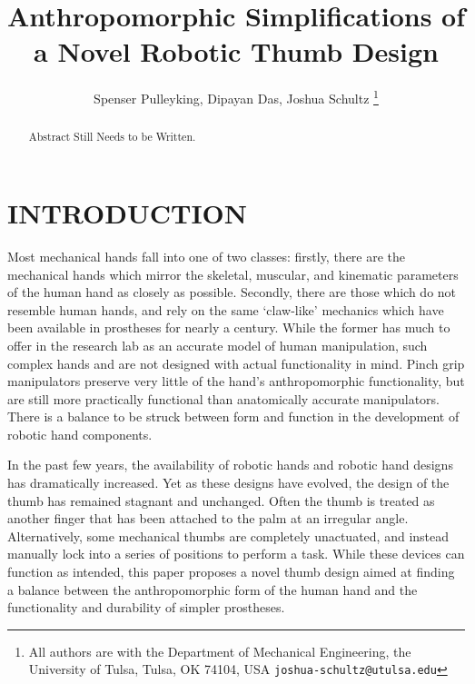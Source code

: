 \documentclass[letterpaper, 10 pt, conference]{ieeeconf}  %
\title{\LARGE \bf
Anthropomorphic Simplifications of a Novel Robotic Thumb Design
}
\author{Spenser Pulleyking, Dipayan Das, Joshua Schultz%
\thanks{All authors are with the Department of Mechanical Engineering, the University of Tulsa, Tulsa, OK 74104, USA
        {\tt\small joshua-schultz@utulsa.edu}}%
}
\begin{document}
\maketitle
\thispagestyle{empty}
\pagestyle{empty}


\begin{abstract}


Abstract Still Needs to be Written.

\end{abstract}


\section{INTRODUCTION}\label{intro}
%

Most mechanical hands fall into one of two classes: firstly, there are the mechanical hands which mirror the skeletal, muscular, and kinematic parameters of the human hand as closely as possible. Secondly, there are those which do not resemble human hands, and rely on the same ‘claw-like’ mechanics which have been available in prostheses for nearly a century. While the former has much to offer in the research lab as an accurate model of human manipulation, such complex hands and are not designed with actual functionality in mind. Pinch grip manipulators preserve very little of the hand's anthropomorphic functionality, but are still more practically functional than anatomically accurate manipulators. There is a balance to be struck between form and function in the development of robotic hand components.

In the past few years, the availability of robotic hands and robotic hand designs has dramatically increased. Yet as these designs have evolved, the design of the thumb has remained stagnant and unchanged. Often the thumb is treated as another finger that has been attached to the palm at an irregular angle. Alternatively, some mechanical thumbs are completely unactuated,  and instead manually lock into a series of positions to perform a task. While these devices can function as intended, this paper proposes a novel thumb design aimed at finding a balance between the anthropomorphic form of the human hand and the functionality and durability of simpler prostheses.
\end{document}
